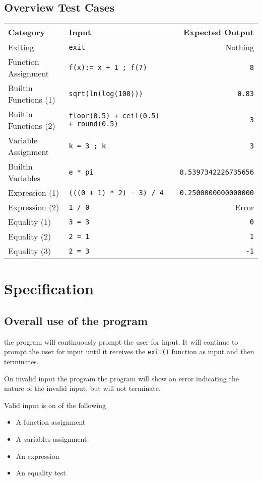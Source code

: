 \documentclass[11pt,a4paper]{article}
\begin{document}
\subsection{Overview Test Cases}

\begin{center}
\begin{tabular}{llr}
Category & Input & Expected Output\\
\hline
Exiting & \texttt{exit} & Nothing\\
Function Assignment & \texttt{f(x):= x + 1 ; f(7)} & \texttt{8}\\
Builtin Functions (1) & \texttt{sqrt(ln(log(100)))} & \texttt{0.83}\\
Builtin Functions (2) & \texttt{floor(0.5) + ceil(0.5) + round(0.5)} & \texttt{3}\\
Variable Assignment & \texttt{k = 3 ; k} & \texttt{3}\\
Builtin Variables & \texttt{e * pi} & \texttt{8.5397342226735656}\\
Expression (1) & \texttt{(((0 + 1) * 2) - 3) / 4} & \texttt{-0.2500000000000000}\\
Expression (2) & \texttt{1 / 0} & Error\\
Equality (1) & \texttt{3 = 3} & \texttt{0}\\
Equality (2) & \texttt{2 = 1} & \texttt{1}\\
Equality (3) & \texttt{2 = 3} & \texttt{-1}\\
\end{tabular}
\end{center}


\appendix
\section{Specification} \label{app:specification}
\subsection{Overall use of the program}
the program will continuously prompt the user for input. It will
continue to prompt the user for input until it receives the
\texttt{exit()} function as input and then terminates.

On invalid input the program the program will show an error
indicating the nature of the invalid input, but will not terminate.

Valid input is on of the following
\begin{itemize}
\item A function assignment
\item A variables assignment
\item An expression
\item An equality test
\end{itemize}
\end{document}
